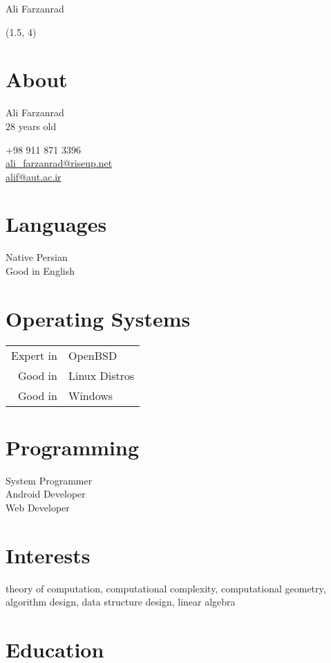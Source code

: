 \documentclass[a4paper,10pt]{article}
\begin{document}
{\Huge Ali Farzanrad}

\begin{textblock}{3.8}(1.5, 4)
	\raggedleft
	\section*{About}

	Ali Farzanrad \\
	28 years old

	+98 911 871 3396 \\
	\href{mailto:ali_farzanrad@riseup.net}{ali\_farzanrad@riseup.net} \\
	\href{mailto:alif@aut.ac.ir}{alif@aut.ac.ir}

	\section*{Languages}

	Native Persian \\
	Good in English

	\section*{Operating Systems}

	\begin{tabular}{rl}
		Expert in & OpenBSD \\
		Good in & Linux Distros \\
		Good in & Windows
	\end{tabular}

	\section*{Programming}

	System Programmer \\
	Android Developer \\
	Web Developer

\end{textblock}

\section*{{\color{blue}I}nterests}

theory of computation, computational complexity, computational
geometry, algorithm design, data structure design, linear algebra

\section*{{\color{red}E}ducation}
\end{document}
